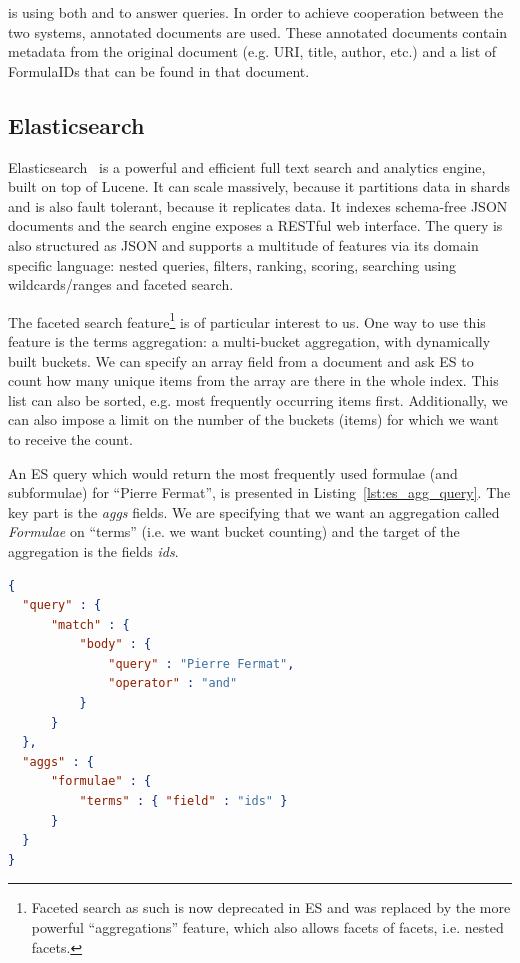 \tms is using both \mws and \els to answer queries.
In order to achieve cooperation between the two systems, annotated documents
are used. These annotated documents contain metadata from the original document
(e.g. URI, title, author, etc.) and a list of \textsf{FormulaID}s that can be
found in that document.

\subsection{Elasticsearch}\label{subsec:prelim:els}
Elasticsearch~\cite{esl:online} is a powerful and efficient full text search
and analytics engine, built on top of Lucene. It can scale massively, because
it partitions data in shards and is also fault tolerant, because it replicates
data.  It indexes schema-free JSON documents and the search engine exposes a
RESTful web interface.  The query is also structured as JSON and supports a
multitude of features via its domain specific language:  nested queries,
filters, ranking, scoring, searching using wildcards/ranges and faceted search.

The faceted search feature\footnote{Faceted search as such is now deprecated in
    ES and was replaced by the more powerful ``aggregations'' feature, which
    also allows facets of facets, i.e. nested facets.} is of
particular interest to us. 
One way to use this feature is the terms aggregation: a multi-bucket
aggregation, with dynamically built buckets.  We can specify an array field
from a document and ask ES to count how many unique items from the array are
there in the whole index.  This list can also be sorted, e.g. most frequently
occurring items first.  Additionally, we can also impose a limit on the number
of the buckets (items) for which we want to receive the count.

An ES query which would return the most frequently used formulae (and
subformulae) for ``Pierre Fermat'', is presented in
Listing~\ref{lst:es_agg_query}. The key part is the \emph{aggs} fields. We are
specifying that we want an aggregation called \textit{Formulae} on ``terms''
(i.e. we want bucket counting) and the target of the aggregation is the fields
\emph{ids}.

\begin{lstlisting}[language=json,firstnumber=1,caption=Elastic Search Term
Aggregation Query, captionpos=b, label=lst:es_agg_query]
{
  "query" : {
      "match" : {
          "body" : {
              "query" : "Pierre Fermat",
              "operator" : "and"
          }
      }
  },
  "aggs" : {
      "formulae" : {
          "terms" : { "field" : "ids" }
      }
  }
}
\end{lstlisting}

